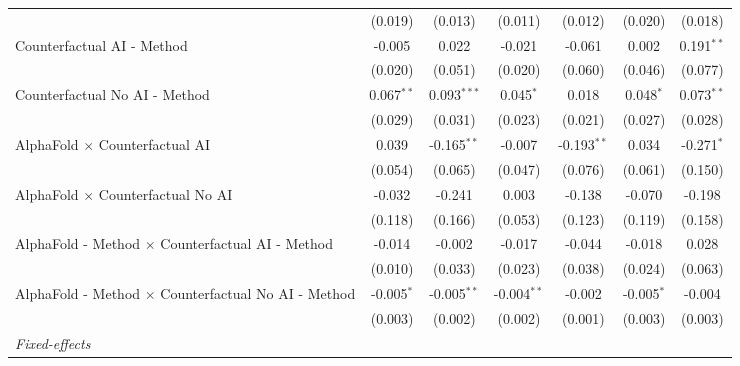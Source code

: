 \begin{tabular}{lcccccc}
                                                              & (0.019)       & (0.013)       & (0.011)       & (0.012)       & (0.020)       & (0.018)\\   
   Counterfactual AI - Method                                 & -0.005        & 0.022         & -0.021        & -0.061        & 0.002         & 0.191$^{**}$\\   
                                                              & (0.020)       & (0.051)       & (0.020)       & (0.060)       & (0.046)       & (0.077)\\   
   Counterfactual No AI - Method                              & 0.067$^{**}$  & 0.093$^{***}$ & 0.045$^{*}$   & 0.018         & 0.048$^{*}$   & 0.073$^{**}$\\   
                                                              & (0.029)       & (0.031)       & (0.023)       & (0.021)       & (0.027)       & (0.028)\\   
   AlphaFold $\times$ Counterfactual AI                       & 0.039         & -0.165$^{**}$ & -0.007        & -0.193$^{**}$ & 0.034         & -0.271$^{*}$\\   
                                                              & (0.054)       & (0.065)       & (0.047)       & (0.076)       & (0.061)       & (0.150)\\   
   AlphaFold $\times$ Counterfactual No AI                    & -0.032        & -0.241        & 0.003         & -0.138        & -0.070        & -0.198\\   
                                                              & (0.118)       & (0.166)       & (0.053)       & (0.123)       & (0.119)       & (0.158)\\   
   AlphaFold - Method $\times$ Counterfactual AI - Method     & -0.014        & -0.002        & -0.017        & -0.044        & -0.018        & 0.028\\   
                                                              & (0.010)       & (0.033)       & (0.023)       & (0.038)       & (0.024)       & (0.063)\\   
   AlphaFold - Method $\times$ Counterfactual No AI - Method  & -0.005$^{*}$  & -0.005$^{**}$ & -0.004$^{**}$ & -0.002        & -0.005$^{*}$  & -0.004\\   
                                                              & (0.003)       & (0.002)       & (0.002)       & (0.001)       & (0.003)       & (0.003)\\   
   \midrule
   \emph{Fixed-effects}\\

\end{tabular}
